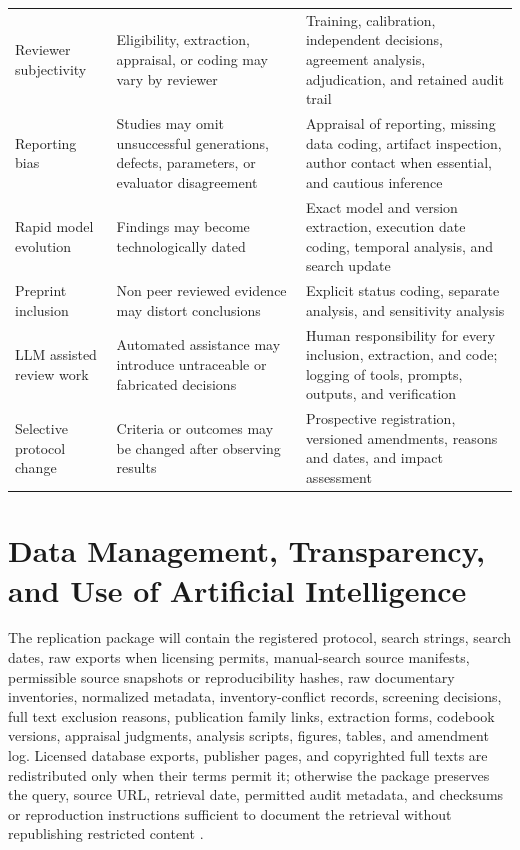 \begin{longtable}{p{} p{} p{}}
Reviewer subjectivity & Eligibility, extraction, appraisal, or coding may vary by reviewer & Training, calibration, independent decisions, agreement analysis, adjudication, and retained audit trail \\
Reporting bias & Studies may omit unsuccessful generations, defects, parameters, or evaluator disagreement & Appraisal of reporting, missing data coding, artifact inspection, author contact when essential, and cautious inference \\
Rapid model evolution & Findings may become technologically dated & Exact model and version extraction, execution date coding, temporal analysis, and search update \\
Preprint inclusion & Non peer reviewed evidence may distort conclusions & Explicit status coding, separate analysis, and sensitivity analysis \\
LLM assisted review work & Automated assistance may introduce untraceable or fabricated decisions & Human responsibility for every inclusion, extraction, and code; logging of tools, prompts, outputs, and verification \\
Selective protocol change & Criteria or outcomes may be changed after observing results & Prospective registration, versioned amendments, reasons and dates, and impact assessment \\
\bottomrule
\end{longtable}

\section{Data Management, Transparency, and Use of Artificial Intelligence}
\label{sec:protocol_data}

The replication package will contain the registered protocol, search strings, search dates, raw exports when licensing permits, manual-search source manifests, permissible source snapshots or reproducibility hashes, raw documentary inventories, normalized metadata, inventory-conflict records, screening decisions, full text exclusion reasons, publication family links, extraction forms, codebook versions, appraisal judgments, analysis scripts, figures, tables, and amendment log. Licensed database exports, publisher pages, and copyrighted full texts are redistributed only when their terms permit it; otherwise the package preserves the query, source URL, retrieval date, permitted audit metadata, and checksums or reproduction instructions sufficient to document the retrieval without republishing restricted content \cite{Rethlefsen2021PRISMAS}.

